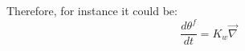 Therefore, for instance it could be:
\begin{equation}
\frac{d \theta^f}{dt} = K_w \vec{\nabla}{}
\end{equation}